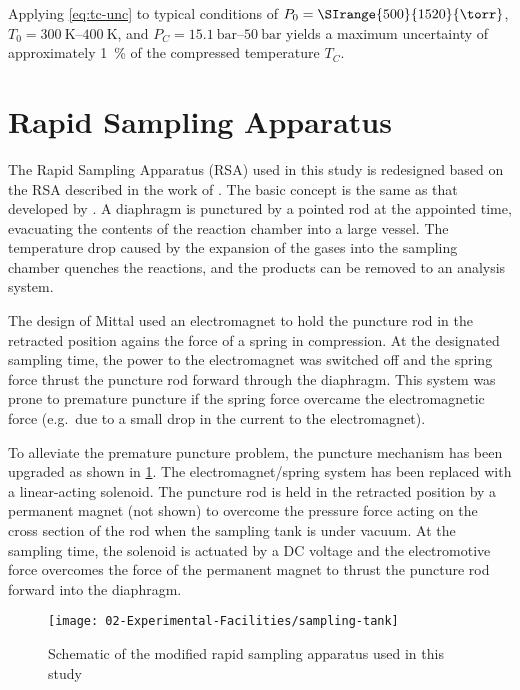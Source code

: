 \documentclass[../main.tex]{subfiles}
\begin{document}
Applying \cref{eq:tc-unc} to typical conditions of $P_0 = \SIrange{500}{1520}{\torr}$,
$T_0=\SIrange{300}{400}{\kelvin}$, and $P_C=\SIrange{15.1}{50}{\bar}$ yields
a maximum uncertainty of approximately \SI{1}{\percent} of the
compressed temperature $T_C$.

\section{Rapid Sampling Apparatus}
\label{sec:rsa}

The Rapid Sampling Apparatus (RSA) used in this study is redesigned based
on the RSA described in the work of \textcite{Mittal2007, Mittal2006a}.
The basic concept is the same as that developed by \textcite{Roblee1961}.
A diaphragm is punctured by a pointed rod at the appointed time,
evacuating the contents of the reaction chamber into a large vessel. The
temperature drop caused by the expansion of the gases into the sampling
chamber quenches the reactions, and the products can be removed to an
analysis system.

The design of Mittal \cite{Mittal2007, Mittal2006a} used an electromagnet
to hold the puncture rod in the retracted position agains the force of a
spring in compression. At the designated sampling time, the
power to the electromagnet was switched off and the spring force thrust
the puncture rod forward through the diaphragm. This system was prone to
premature puncture if the spring force overcame the electromagnetic
force (e.g.\ due to a small drop in the current to the electromagnet).

To alleviate the premature puncture problem, the puncture mechanism has
been upgraded as shown in \cref{fig:sampling-tank}. The
electromagnet/spring system has been replaced with a linear-acting
solenoid. The puncture rod is held in the retracted position by a
permanent magnet (not shown) to overcome the pressure force acting on
the cross section of the rod when the sampling tank is under
vacuum. At the sampling time, the solenoid is actuated by a DC voltage and
the electromotive force overcomes the force of the permanent magnet to thrust
the puncture rod forward into the diaphragm.

\begin{figure}
\texttt{[image: 02-Experimental-Facilities/sampling-tank]}
\caption{Schematic of the modified rapid sampling apparatus used in this study}
\label{fig:sampling-tank}
\end{figure}
\end{document}
